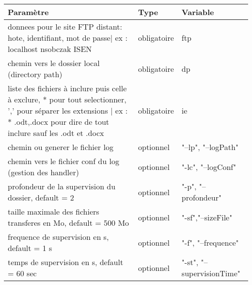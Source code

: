 \begin{tabular}{|R{8cm}|C{3cm}|L{3cm}|}
\hline {} Paramètre & Type &  Variable  \\
\hline  donnees pour le site FTP distant: hote, identifiant, mot de passe| ex : localhost nsobczak ISEN & obligatoire & ftp  \\
\hline  chemin vers le dossier local (directory path) & obligatoire & dp  \\
\hline  liste des fichiers à inclure puis celle à exclure, * pour tout selectionner, ',' pour séparer les extensions
| ex : * .odt,.docx pour dire de tout inclure sauf les .odt et .docx & obligatoire & ie  \\

\hline  chemin ou generer le fichier log & optionnel & "--lp", "--logPath"  \\
\hline  chemin vers le fichier conf du log (gestion des handler) & optionnel & "-lc", "--logConf"  \\
\hline  profondeur de la supervision du dossier, default = 2 & optionnel & "-p", "--profondeur"  \\
\hline  taille maximale des fichiers transferes en Mo, default = 500 Mo & optionnel & "-sf","--sizeFile"  \\
\hline  frequence de supervision en s, default = 1 s & optionnel & "-f", "--frequence"  \\
\hline  temps de supervision en s, default = 60 sec & optionnel & "-st", "--supervisionTime"  \\
\hline 
\end{tabular}

\begin{comment}
# obligatoire
PARSER.add_argument("ftp", type=str, nargs=3,
		    help="(hote, identifiant, mot_de_passe) :\n" + \
			  "donnees pour le site FTP distant: hote, identifiant, mot de passe" + \
			  "ex : localhost nsobczak ISEN")
PARSER.add_argument("dp", type=str, help="chemin vers le dossier local")
PARSER.add_argument("ie", type=str, nargs=2,
		    help="liste des fichiers à inclure puis celle à exclure, "
			  "* pour tout selectionner, ',' pour séparer les extensions"
			  "ex : * .odt,.docx pour dire de tout inclure sauf les .odt et .docx")

# optionnel
PARSER.add_argument("-lp", "--logPath", default="",
		    help="chemin ou generer le fichier log")
PARSER.add_argument("-lc", "--logConf", default="rsyncFTP.conf",
		    help="chemin vers le fichier conf du log (gestion des handler)")
PARSER.add_argument("-p", "--profondeur", default=5,
		    help="profondeur de la supervision du dossier, default = 2")
PARSER.add_argument("-sf", "--sizeFile", default=500,
		    help="taille maximale des fichiers transferes en Mo, default = 500 Mo")
PARSER.add_argument("-f", "--frequence", default=1,
		    help="frequence de supervision en s, default = 1 s")
PARSER.add_argument("-st", "--supervisionTime", default=-1,
		    help="temps de supervision en s, default = infinite")
\end{comment}


